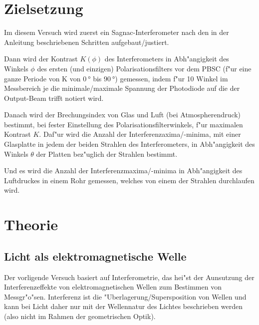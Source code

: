 \section{Zielsetzung}
  \label{sec:Zielsetzung}
  Im diesem Versuch wird zuerst ein Sagnac-Interferometer nach den in der Anleitung beschriebenen Schritten aufgebaut/justiert.

  Dann wird der Kontrast $K(\phi)$ des Interferometers in Abh"angigkeit des Winkels $\phi$ des ersten (und einzigen) Polarisationsfilters vor dem PBSC (f"ur eine ganze Periode von K von $\SI{0}{\degree}$ bis $\SI{90}{\degree}$) gemessen, indem f"ur 10 Winkel im Messbereich je die minimale/maximale Spannung der Photodiode auf die der Output-Beam trifft notiert wird.

  Danach wird der Brechungsindex von Glas und Luft (bei Atmospherendruck) bestimmt, bei fester Einstellung des Polarisationsfilterwinkels, f"ur maximalen Kontrast $K$.
  Daf"ur wird die Anzahl der Interferenzaxima/-minima, mit einer Glasplatte in jedem der beiden Strahlen des Interferometers, in Abh"angigkeit des Winkels $\theta$ der Platten bez"uglich der Strahlen bestimmt.

  Und es wird die Anzahl der Interferenzmaxima/-minima in Abh"angigkeit des Luftdruckes in einem Rohr gemessen, welches von einem der Strahlen durchlaufen wird.




\section{Theorie}
  \label{sec:Theorie}
  \subsection{Licht als elektromagnetische Welle}
    Der vorligende Versuch basiert auf Interferometrie, das hei"st der Aunsutzung der Interferenzeffekte von elektromagnetischen Wellen zum Bestimmen von Messgr"o"sen.
    Interferenz ist die "Uberlagerung/Supersposition von Wellen und kann bei Licht daher nur mit der Wellennatur des Lichtes beschrieben werden (also nicht im Rahmen der geometrischen Optik).

